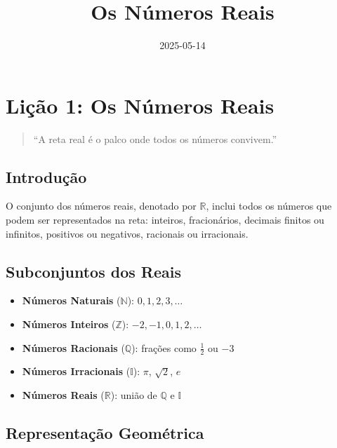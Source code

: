 \documentclass[
  letterpaper,
  DIV=11,
  numbers=noendperiod]{scrartcl}
\title{Os Números Reais}
\author{}
\date{2025-05-14}
\providecommand{\tightlist}{%
  \setlength{\itemsep}{0pt}\setlength{\parskip}{0pt}}\usepackage{longtable,booktabs,array}
\renewcommand*\contentsname{Índice}
\newcommand\contentsname{Índice}
\begin{document}
\maketitle

\renewcommand*\contentsname{Índice}
{
\hypersetup{linkcolor=}
\setcounter{tocdepth}{3}
\tableofcontents
}

\section{Lição 1: Os Números
Reais}\label{liuxe7uxe3o-1-os-nuxfameros-reais}

\begin{quote}
``A reta real é o palco onde todos os números convivem.''
\end{quote}

\subsection{Introdução}\label{introduuxe7uxe3o}

O conjunto dos números reais, denotado por \(\mathbb{R}\), inclui todos
os números que podem ser representados na reta: inteiros, fracionários,
decimais finitos ou infinitos, positivos ou negativos, racionais ou
irracionais.

\subsection{Subconjuntos dos Reais}\label{subconjuntos-dos-reais}

\begin{itemize}
\tightlist
\item
  \textbf{Números Naturais} (\(\mathbb{N}\)): \(0, 1, 2, 3, \dots\)
\item
  \textbf{Números Inteiros} (\(\mathbb{Z}\)): \(-2, -1, 0, 1, 2, \dots\)
\item
  \textbf{Números Racionais} (\(\mathbb{Q}\)): frações como
  \(\frac{1}{2}\) ou \(-3\)
\item
  \textbf{Números Irracionais} (\(\mathbb{I}\)): \(\pi\), \(\sqrt{2}\),
  \(e\)
\item
  \textbf{Números Reais} (\(\mathbb{R}\)): união de \(\mathbb{Q}\) e
  \(\mathbb{I}\)
\end{itemize}

\subsection{Representação
Geométrica}\label{representauxe7uxe3o-geomuxe9trica}
\end{document}
